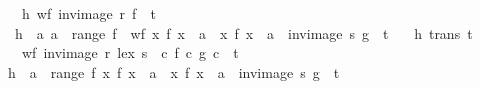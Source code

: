 \begin{isabellebody}
\ \ \ h{}{\isacharcolon}{\kern0pt}\ {\isachardoublequoteopen}wf\ {\isacharparenleft}{\kern0pt}{\isacharparenleft}{\kern0pt}inv{\isacharunderscore}{\kern0pt}image\ r\ f{\isacharparenright}{\kern0pt}\ {\isasyminter}\ t{\isacharparenright}{\kern0pt}{\isachardoublequoteclose}\ \isanewline
\ \ h{}{\isacharcolon}{\kern0pt}\ {\isachardoublequoteopen}{\isasymAnd}\ a{\isachardot}{\kern0pt}\ a\ {\isasymin}\ range\ f\ {\isasymLongrightarrow}\ wf\ {\isacharparenleft}{\kern0pt}{\isacharparenleft}{\kern0pt}{\isacharbraceleft}{\kern0pt}x{\isachardot}{\kern0pt}\ f\ x\ {\isacharequal}{\kern0pt}\ a{\isacharbraceright}{\kern0pt}\ {\isasymtimes}\ {\isacharbraceleft}{\kern0pt}x{\isachardot}{\kern0pt}\ f\ x\ {\isacharequal}{\kern0pt}\ a{\isacharbraceright}{\kern0pt}\ {\isasyminter}\ {\isacharparenleft}{\kern0pt}inv{\isacharunderscore}{\kern0pt}image\ s\ g{\isacharparenright}{\kern0pt}{\isacharparenright}{\kern0pt}\ {\isasyminter}\ t{\isacharparenright}{\kern0pt}{\isachardoublequoteclose}\ \isanewline
\ \ h{}{\isacharcolon}{\kern0pt}\ {\isachardoublequoteopen}trans\ t{\isachardoublequoteclose}\isanewline
\ \ \ {\isachardoublequoteopen}wf\ {\isacharparenleft}{\kern0pt}{\isacharparenleft}{\kern0pt}inv{\isacharunderscore}{\kern0pt}image\ {\isacharparenleft}{\kern0pt}r\ {\isacharless}{\kern0pt}{\isacharasterisk}{\kern0pt}lex{\isacharasterisk}{\kern0pt}{\isachargreater}{\kern0pt}\ s{\isacharparenright}{\kern0pt}\ {\isacharparenleft}{\kern0pt}{\isasymlambda}\ c{\isachardot}{\kern0pt}\ {\isacharparenleft}{\kern0pt}f\ c{\isacharcomma}{\kern0pt}\ g\ c{\isacharparenright}{\kern0pt}{\isacharparenright}{\kern0pt}{\isacharparenright}{\kern0pt}\ {\isasyminter}\ t{\isacharparenright}{\kern0pt}{\isachardoublequoteclose}\isanewline
%
\isadelimproof
%
\endisadelimproof
%
\isatagproof
{}\isamarkupfalse%
{\isacharminus}{\kern0pt}\isanewline
\ \ \isamarkupfalse%
\ h{}{\isacharcolon}{\kern0pt}\ {\isachardoublequoteopen}{\isacharparenleft}{\kern0pt}{\isasymUnion}\ a\ {\isasymin}\ range\ f{\isachardot}{\kern0pt}\ {\isacharparenleft}{\kern0pt}{\isacharbraceleft}{\kern0pt}x{\isachardot}{\kern0pt}\ f\ x\ {\isacharequal}{\kern0pt}\ a{\isacharbraceright}{\kern0pt}\ {\isasymtimes}\ {\isacharbraceleft}{\kern0pt}x{\isachardot}{\kern0pt}\ f\ x\ {\isacharequal}{\kern0pt}\ a{\isacharbraceright}{\kern0pt}\ {\isasyminter}\ {\isacharparenleft}{\kern0pt}inv{\isacharunderscore}{\kern0pt}image\ s\ g{\isacharparenright}{\kern0pt}{\isacharparenright}{\kern0pt}\ {\isasyminter}\ t{\isacharparenright}{\kern0pt}\ {\isacharequal}{\kern0pt}\ \isanewline

\end{isabellebody}
